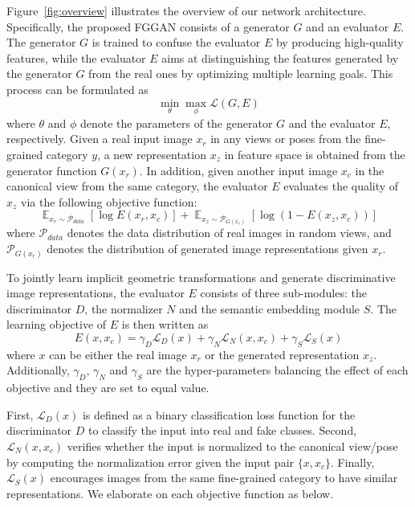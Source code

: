 \documentclass[runningheads]{llncs}
\begin{document}
Figure~\ref{fig:overview} illustrates the overview of our network architecture. 
Specifically, the proposed FGGAN consists of a generator $G$ and an evaluator $E$. 
The generator $G$ is trained to confuse the evaluator $E$ by producing high-quality features, while the evaluator $E$ aims at distinguishing the features generated by the generator $G$ from the real ones by optimizing multiple learning goals. This process can be formulated as
\begin{equation}
    \min_{\theta} \max_{\phi} \mathcal{L}(G, E)
    \label{eq:gan_form}
\end{equation}
where $\theta$ and $\phi$ denote the parameters of the generator $G$ and the evaluator $E$, respectively.
Given a real input image $x_r$ in any views or poses from the fine-grained category $y$, a new representation $x_z$ in feature space is obtained from the generator function $G(x_r)$.
In addition, given another input image $x_c$ in the canonical view from the same category, the evaluator $E$ evaluates the quality of $x_z$ via the following objective function:
\begin{equation}
    \mathop{\mathbb{E}}_{x_r \sim \mathcal{P}_{data}}\left[ \log E(x_r, x_c) \right] + \mathop{\mathbb{E}}_{x_z \sim \mathcal{P}_{G(x_r)}} \left[\log(1-E(x_z,x_c)) \right]
    \label{eq:e_loss}
\end{equation}
where $\mathcal{P}_{data}$ denotes the data distribution of real images in random views, and $\mathcal{P}_{G(x_r)}$ denotes the distribution of generated image representations given $x_r$.


To jointly learn implicit geometric transformations and generate discriminative image representations, the evaluator $E$ consists of three sub-modules: the discriminator $D$, the normalizer $N$ and the semantic embedding module $S$. 
The learning objective of $E$ is then written as
\begin{equation}
    E(x, x_c) = \gamma_D \mathcal{L}_D(x)+\gamma_N \mathcal{L}_N(x, x_c)+ \gamma_S\mathcal{L}_S(x)
    \label{eq:evaluator}
\end{equation}
where $x$ can be either the real image $x_r$ or the generated representation $x_z$. Additionally, $\gamma_D$, $\gamma_N$ and $\gamma_S$ are the hyper-parameters balancing the effect of each objective and they are set to equal value.

First, $\mathcal{L}_D(x)$ is defined as a binary classification loss function for the discriminator $D$ to classify the input into real and fake classes. Second, $\mathcal{L}_N(x,x_c)$ verifies whether the input is normalized to the canonical view/pose by computing the normalization error given the input pair $\{x,x_c\}$. Finally, $\mathcal{L}_S(x)$ encourages images from the same fine-grained category to have similar representations. We elaborate on each objective function as below.
\end{document}
